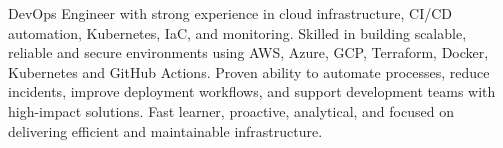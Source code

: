 DevOps Engineer with strong experience in cloud infrastructure, CI/CD automation, Kubernetes, IaC, and monitoring. Skilled in building scalable, reliable and secure environments using AWS, Azure, GCP, Terraform, Docker, Kubernetes and GitHub Actions. Proven ability to automate processes, reduce incidents, improve deployment workflows, and support development teams with high-impact solutions. Fast learner, proactive, analytical, and focused on delivering efficient and maintainable infrastructure.